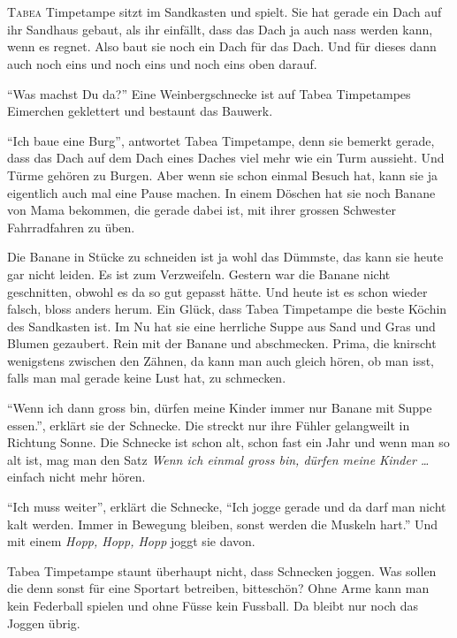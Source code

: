 \chapter*{}
\lettrine[lines=3]{\color{DeepPink}T}{abea} Timpetampe sitzt im Sandkasten und spielt. Sie hat gerade ein Dach auf ihr Sandhaus gebaut, als ihr einfällt, dass das Dach ja auch nass werden kann, wenn es regnet. Also baut sie noch ein Dach für das Dach. Und für dieses dann auch noch eins und noch eins und noch eins oben darauf.

\enquote{Was machst Du da?} Eine Weinbergschnecke ist auf Tabea Timpetampes Eimerchen geklettert und bestaunt das Bauwerk. 

\enquote{Ich baue eine Burg}, antwortet Tabea Timpetampe, denn sie bemerkt gerade, dass das Dach auf dem Dach eines Daches viel mehr wie ein Turm aussieht. Und Türme gehören zu Burgen. Aber wenn sie schon einmal Besuch hat, kann sie ja eigentlich auch mal eine Pause machen. In einem Döschen hat sie noch Banane von Mama bekommen, die gerade dabei ist, mit ihrer grossen Schwester Fahrradfahren zu üben. 

Die Banane in Stücke zu schneiden ist ja wohl das Dümmste, das kann sie heute gar nicht leiden. Es ist zum Verzweifeln. Gestern war die Banane nicht geschnitten, obwohl es da so gut gepasst hätte. Und heute ist es schon wieder falsch, bloss anders herum. Ein Glück, dass Tabea Timpetampe die beste Köchin des Sandkasten ist. Im Nu hat sie eine herrliche Suppe aus Sand und Gras und Blumen gezaubert. Rein mit der Banane und abschmecken. Prima, die knirscht wenigstens zwischen den Zähnen, da kann man auch gleich hören, ob man isst, falls man mal gerade keine Lust hat, zu schmecken.

\enquote{Wenn ich dann gross bin, dürfen meine Kinder immer nur Banane mit Suppe essen.}, erklärt sie der Schnecke. Die streckt nur ihre Fühler gelangweilt in Richtung Sonne. Die Schnecke ist schon alt, schon fast ein Jahr und wenn man so alt ist, mag man den Satz \textit{Wenn ich einmal gross bin, dürfen meine Kinder \dots} einfach nicht mehr hören.

\enquote{Ich muss weiter}, erklärt die Schnecke, \enquote{Ich jogge gerade und da darf man nicht kalt werden. Immer in Bewegung bleiben, sonst werden die Muskeln hart.} Und mit einem \textit{Hopp, Hopp, Hopp} joggt sie  davon.

Tabea Timpetampe staunt überhaupt nicht, dass Schnecken joggen. Was sollen die denn sonst für eine Sportart betreiben, bitteschön? Ohne Arme kann man kein Federball spielen und ohne Füsse kein Fussball. Da bleibt nur noch das Joggen übrig. 

